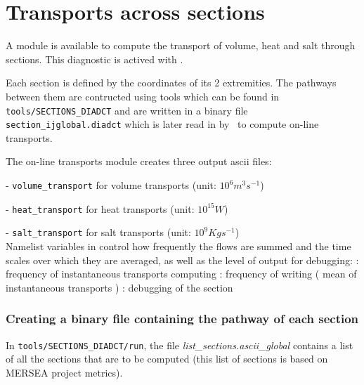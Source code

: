 \documentclass[../main/NEMO_manual]{subfiles}
\begin{document}
\section[Transports across sections]{Transports across sections}
\label{sec:DIA_diag_dct}

\begin{listing}
  \caption{}
  \label{lst:nam_diadct}
\end{listing}

A module is available to compute the transport of volume, heat and salt through sections.
This diagnostic is actived with .

Each section is defined by the coordinates of its 2 extremities.
The pathways between them are contructed using tools which can be found in \texttt{tools/SECTIONS\_DIADCT}
and are written in a binary file \texttt{section\_ijglobal.diadct} which is later read in by
\NEMO\ to compute on-line transports.

The on-line transports module creates three output ascii files:

- \texttt{volume\_transport} for volume transports (unit: $10^{6} m^{3} s^{-1}$)

- \texttt{heat\_transport}   for   heat transports (unit: $10^{15} W$)

- \texttt{salt\_transport}   for   salt transports (unit: $10^{9}Kg s^{-1}$) \\

Namelist variables in  control how frequently the flows are summed and the time scales over which
they are averaged, as well as the level of output for debugging:
   : frequency of instantaneous transports computing
: frequency of writing ( mean of instantaneous transports )
 : debugging of the section

\subsubsection{Creating a binary file containing the pathway of each section}

In \texttt{tools/SECTIONS\_DIADCT/run},
the file \textit{ {list\_sections.ascii\_global}} contains a list of all the sections that are to be computed
(this list of sections is based on MERSEA project metrics).
\end{document}
